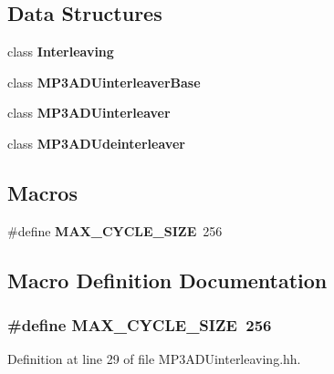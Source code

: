 \subsection*{Data Structures}
\begin{DoxyCompactItemize}
\item 
class {\bf Interleaving}
\item 
class {\bf M\+P3\+A\+D\+Uinterleaver\+Base}
\item 
class {\bf M\+P3\+A\+D\+Uinterleaver}
\item 
class {\bf M\+P3\+A\+D\+Udeinterleaver}
\end{DoxyCompactItemize}
\subsection*{Macros}
\begin{DoxyCompactItemize}
\item 
\#define {\bf M\+A\+X\+\_\+\+C\+Y\+C\+L\+E\+\_\+\+S\+I\+Z\+E}~256
\end{DoxyCompactItemize}


\subsection{Macro Definition Documentation}
\subsubsection[{M\+A\+X\+\_\+\+C\+Y\+C\+L\+E\+\_\+\+S\+I\+Z\+E}]{\setlength{\rightskip}{0pt plus 5cm}\#define M\+A\+X\+\_\+\+C\+Y\+C\+L\+E\+\_\+\+S\+I\+Z\+E~256}\label{MP3ADUinterleaving_8hh_ad5d0f62d044b07561d0e267cede23cda}


Definition at line 29 of file M\+P3\+A\+D\+Uinterleaving.\+hh.

